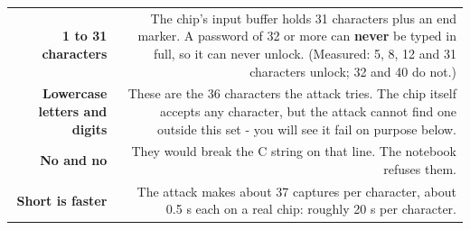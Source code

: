 \documentclass[11pt,letterpaper]{article}
\begin{document}
{\small{}
\begin{longtable}{|R{0.3188}|R{0.6812}|}
\hline
{} &  \\ \hline
\endhead
\textbf{1 to 31 characters} & The chip's input buffer holds 31 characters plus an end marker. A password of 32 or more can \textbf{never} be typed in full, so it can never unlock. (Measured: 5, 8, 12 and 31 characters unlock; 32 and 40 do not.) \\ \hline
\textbf{Lowercase letters  and digits } & These are the 36 characters the attack tries. The chip itself accepts any character, but the attack cannot find one outside this set - you will see it fail on purpose below. \\ \hline
\textbf{No \codesmall{\textquotedbl{}} and no \codesmall{\textbackslash{}}} & They would break the C string on that line. The notebook refuses them. \\ \hline
\textbf{Short is faster} & The attack makes about 37 captures per character, about 0.5 s each on a real chip: roughly 20 s per character. \\ \hline
\end{longtable}}

\vspace{4pt}


\end{document}
